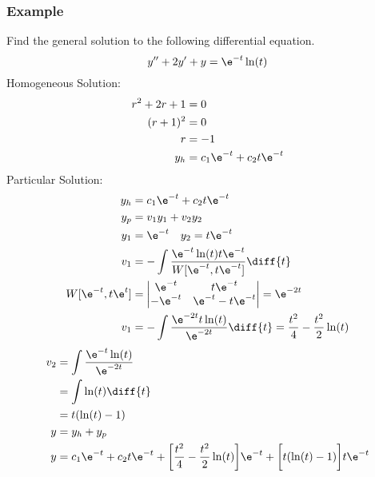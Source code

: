 \documentclass{math}
\begin{document}
\subsubsection*{Example}
Find the general solution to the following differential equation.
\[ y''+2y'+y = \e^{-t}\ln(t) \]
Homogeneous Solution:
\begin{align*}
  r^2+2r+1 &= 0 \\
  (r+1)^2 &= 0 \\
  r &= -1 \\
  y_h &= c_1\e^{-t}+c_2t\e^{-t}
\end{align*}
Particular Solution:
\begin{align*}
  y_h &= c_1\e^{-t}+c_2t\e^{-t} \\
  y_p &= v_1y_1+v_2y_2 \\
  y_1 &= \e^{-t} \quad y_2 = t\e^{-t} \\
  v_1 &= -\int\frac{\e^{-t}\ln(t)t\e^{-t}}{W[\e^{-t},t\e^{-t}]}\diff{t} \\
  W[\e^{-t},t\e^{t}] &= \begin{vmatrix}
    \e^{-t} & t\e^{-t} \\
    -\e^{-t} & \e^{-t}-t\e^{-t}
  \end{vmatrix} = \e^{-2t} \\
  v_1 &= -\int\frac{\e^{-2t}t\ln(t)}{\e^{-2t}}\diff{t} =
    \frac{t^2}{4}-\frac{t^2}{2}\ln(t)
\end{align*}
\begin{align*}
  v_2 &= \int\frac{\e^{-t}\ln(t)}{\e^{-2t}} \\
  &= \int\ln(t)\diff{t} \\
  &= t(\ln(t)-1) \\
  y &= y_h+y_p \\
  y &= c_1\e^{-t}+c_2t\e^{-t}+
    \bigg[\frac{t^2}{4}-\frac{t^2}{2}\ln(t)\bigg]\e^{-t} +
    \bigg[t(\ln(t)-1)\bigg]t\e^{-t} \\
\end{align*}
\end{document}
